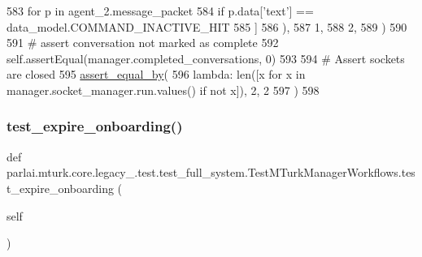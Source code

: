 \begin{DoxyCode}
583                     \textcolor{keywordflow}{for} p \textcolor{keywordflow}{in} agent\_2.message\_packet
584                     \textcolor{keywordflow}{if} p.data[\textcolor{stringliteral}{'text'}] == data\_model.COMMAND\_INACTIVE\_HIT
585                 ]
586             ),
587             1,
588             2,
589         )
590 
591         \textcolor{comment}{# assert conversation not marked as complete}
592         self.assertEqual(manager.completed\_conversations, 0)
593 
594         \textcolor{comment}{# Assert sockets are closed}
595         \hyperlink{namespaceparlai_1_1mturk_1_1core_1_1test_1_1test__full__system_a0b463246d35658a2e422010f13dcf819}{assert\_equal\_by}(
596             \textcolor{keyword}{lambda}: len([x \textcolor{keywordflow}{for} x \textcolor{keywordflow}{in} manager.socket\_manager.run.values() \textcolor{keywordflow}{if} \textcolor{keywordflow}{not} x]), 2, 2
597         )
598 
\end{DoxyCode}
\mbox{\label{classparlai_1_1mturk_1_1core_1_1legacy__2018_1_1test_1_1test__full__system_1_1TestMTurkManagerWorkflows_a5301ddab598be8dd5efc3231e6f0ae75}} 
\subsubsection{\texorpdfstring{test\+\_\+expire\+\_\+onboarding()}{test\_expire\_onboarding()}}
{\footnotesize\ttfamily def parlai.\+mturk.\+core.\+legacy\+\_.\+test.\+test\+\_\+full\+\_\+system.\+Test\+M\+Turk\+Manager\+Workflows.\+test\+\_\+expire\+\_\+onboarding (\begin{DoxyParamCaption}\item[{}]{self }\end{DoxyParamCaption})}



